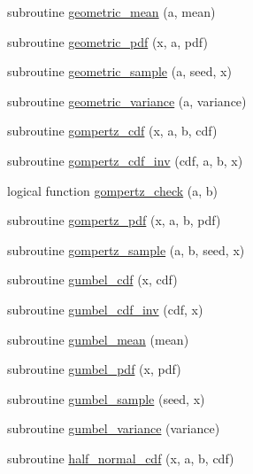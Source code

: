 \begin{DoxyCompactItemize}
\item 
subroutine \hyperlink{_bhabha__fortran__sem__doxy_8f_a1ffa752cfa7e58c775d58ebf3ddff183}{geometric\+\_\+mean} (a, mean)
\item 
subroutine \hyperlink{_bhabha__fortran__sem__doxy_8f_ad7c75816231cf277056551ca6c56d50d}{geometric\+\_\+pdf} (x, a, pdf)
\item 
subroutine \hyperlink{_bhabha__fortran__sem__doxy_8f_a8e9806974aa07e008b7027a4d4fccca8}{geometric\+\_\+sample} (a, seed, x)
\item 
subroutine \hyperlink{_bhabha__fortran__sem__doxy_8f_ae112b39e2f8d5468f1f366cc8e3afd90}{geometric\+\_\+variance} (a, variance)
\item 
subroutine \hyperlink{_bhabha__fortran__sem__doxy_8f_af902e014759d310f9104881f90934632}{gompertz\+\_\+cdf} (x, a, b, cdf)
\item 
subroutine \hyperlink{_bhabha__fortran__sem__doxy_8f_aca5ab8f72105aabb509bd487e8c8b6e6}{gompertz\+\_\+cdf\+\_\+inv} (cdf, a, b, x)
\item 
logical function \hyperlink{_bhabha__fortran__sem__doxy_8f_a6dcecb2ef74b499aa1313117cb5bf666}{gompertz\+\_\+check} (a, b)
\item 
subroutine \hyperlink{_bhabha__fortran__sem__doxy_8f_ad1b796cd8b7d10dc0096cf2a42b748be}{gompertz\+\_\+pdf} (x, a, b, pdf)
\item 
subroutine \hyperlink{_bhabha__fortran__sem__doxy_8f_adee76c73484194b0ddb1c677c0d03407}{gompertz\+\_\+sample} (a, b, seed, x)
\item 
subroutine \hyperlink{_bhabha__fortran__sem__doxy_8f_a3406fe8568d2dfb52a66cc4470893365}{gumbel\+\_\+cdf} (x, cdf)
\item 
subroutine \hyperlink{_bhabha__fortran__sem__doxy_8f_af645551cd94f4f929966f33fade3bb03}{gumbel\+\_\+cdf\+\_\+inv} (cdf, x)
\item 
subroutine \hyperlink{_bhabha__fortran__sem__doxy_8f_ab25784871afe33475733991e2db8c754}{gumbel\+\_\+mean} (mean)
\item 
subroutine \hyperlink{_bhabha__fortran__sem__doxy_8f_a6d2003af12b56d5f9b0a816e24b5775c}{gumbel\+\_\+pdf} (x, pdf)
\item 
subroutine \hyperlink{_bhabha__fortran__sem__doxy_8f_a4eda1bafea5a35dad5e4d1f3c7c4c2fd}{gumbel\+\_\+sample} (seed, x)
\item 
subroutine \hyperlink{_bhabha__fortran__sem__doxy_8f_a0b9d97396f3f7a256ac7b587d8bf44d0}{gumbel\+\_\+variance} (variance)
\item 
subroutine \hyperlink{_bhabha__fortran__sem__doxy_8f_a151eb67716499cd4c2674750d365bbda}{half\+\_\+normal\+\_\+cdf} (x, a, b, cdf)

\end{DoxyCompactItemize}
